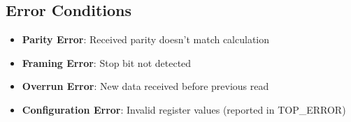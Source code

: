 \subsection{Error Conditions}
\begin{itemize}
\item \textbf{Parity Error}: Received parity doesn't match calculation
\item \textbf{Framing Error}: Stop bit not detected
\item \textbf{Overrun Error}: New data received before previous read
\item \textbf{Configuration Error}: Invalid register values (reported in TOP\_ERROR)
\end{itemize}